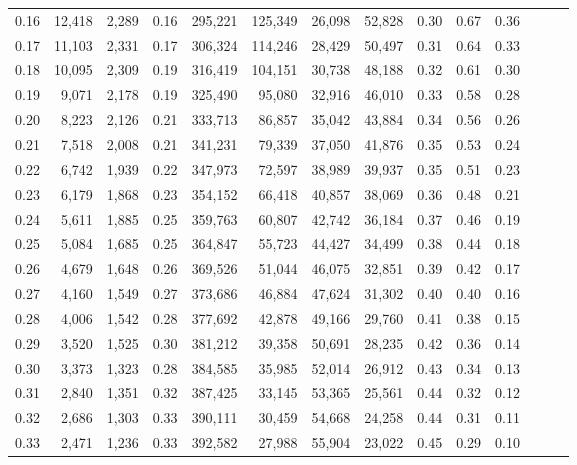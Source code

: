 \begin{tabular}{rrrrrrrrrrrrrr}
0.16 &  12,418 &  2,289 &  0.16 &  295,221 &  125,349 &  26,098 &  52,828 &  0.30 &  0.67 &      0.36 \\
0.17 &  11,103 &  2,331 &  0.17 &  306,324 &  114,246 &  28,429 &  50,497 &  0.31 &  0.64 &      0.33 \\
0.18 &  10,095 &  2,309 &  0.19 &  316,419 &  104,151 &  30,738 &  48,188 &  0.32 &  0.61 &      0.30 \\
0.19 &   9,071 &  2,178 &  0.19 &  325,490 &   95,080 &  32,916 &  46,010 &  0.33 &  0.58 &      0.28 \\
0.20 &   8,223 &  2,126 &  0.21 &  333,713 &   86,857 &  35,042 &  43,884 &  0.34 &  0.56 &      0.26 \\
0.21 &   7,518 &  2,008 &  0.21 &  341,231 &   79,339 &  37,050 &  41,876 &  0.35 &  0.53 &      0.24 \\
0.22 &   6,742 &  1,939 &  0.22 &  347,973 &   72,597 &  38,989 &  39,937 &  0.35 &  0.51 &      0.23 \\
0.23 &   6,179 &  1,868 &  0.23 &  354,152 &   66,418 &  40,857 &  38,069 &  0.36 &  0.48 &      0.21 \\
0.24 &   5,611 &  1,885 &  0.25 &  359,763 &   60,807 &  42,742 &  36,184 &  0.37 &  0.46 &      0.19 \\
0.25 &   5,084 &  1,685 &  0.25 &  364,847 &   55,723 &  44,427 &  34,499 &  0.38 &  0.44 &      0.18 \\
0.26 &   4,679 &  1,648 &  0.26 &  369,526 &   51,044 &  46,075 &  32,851 &  0.39 &  0.42 &      0.17 \\
0.27 &   4,160 &  1,549 &  0.27 &  373,686 &   46,884 &  47,624 &  31,302 &  0.40 &  0.40 &      0.16 \\
0.28 &   4,006 &  1,542 &  0.28 &  377,692 &   42,878 &  49,166 &  29,760 &  0.41 &  0.38 &      0.15 \\
0.29 &   3,520 &  1,525 &  0.30 &  381,212 &   39,358 &  50,691 &  28,235 &  0.42 &  0.36 &      0.14 \\
0.30 &   3,373 &  1,323 &  0.28 &  384,585 &   35,985 &  52,014 &  26,912 &  0.43 &  0.34 &      0.13 \\
0.31 &   2,840 &  1,351 &  0.32 &  387,425 &   33,145 &  53,365 &  25,561 &  0.44 &  0.32 &      0.12 \\
0.32 &   2,686 &  1,303 &  0.33 &  390,111 &   30,459 &  54,668 &  24,258 &  0.44 &  0.31 &      0.11 \\
0.33 &   2,471 &  1,236 &  0.33 &  392,582 &   27,988 &  55,904 &  23,022 &  0.45 &  0.29 &      0.10 \\

\end{tabular}
